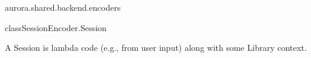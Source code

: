 \begin{texdocpackage}{aurora.shared.backend.encoders}
\begin{texdocclass}{class}{SessionEncoder.Session}
\label{texdoclet:aurora.shared.backend.encoders.SessionEncoder.Session}
\begin{texdocclassintro}
A Session is lambda code (e.g., from user input) along with some Library context.\end{texdocclassintro}
\begin{texdocclassfields}
\end{texdocclassfields}
\begin{texdocclassconstructors}
\end{texdocclassconstructors}
\end{texdocclass}


\end{texdocpackage}



